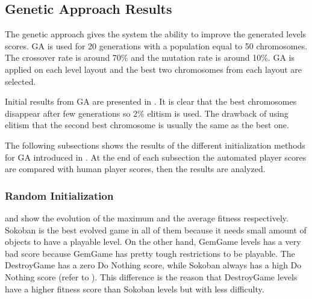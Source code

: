 \subsection{Genetic Approach Results}
The genetic approach gives the system the ability to improve the generated levels scores. GA is used for 20 generations with a population equal to 50 chromosomes. The crossover rate is around 70\% and the mutation rate is around 10\%. GA is applied on each level layout and the best two chromosomes from each layout are selected.\\\par

Initial results from GA are presented in . It is clear that the best chromosomes disappear after few generations so 2\% elitism is used. The drawback of using elitism that the second best chromosome is usually the same as the best one.


The following subsections shows the results of the different initialization methods for GA introduced in . At the end of each subsection the automated player scores are compared with human player scores, then the results are analyzed.

\subsubsection{Random Initialization}
 and  show the evolution of the maximum and the average fitness respectively. Sokoban is the best evolved game in all of them because it needs small amount of objects to have a playable level. On the other hand, GemGame levels has a very bad score because GemGame has pretty tough restrictions to be playable. The DestroyGame has a zero Do Nothing score, while Sokoban always has a high Do Nothing score (refer to ). This difference is the reason that DestroyGame levels have a higher fitness score than Sokoban levels but with less difficulty.




